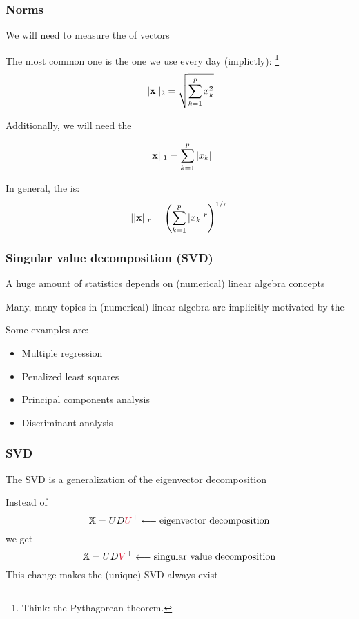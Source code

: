\documentclass{beamer}
\begin{document}
\begin{frame}
\frametitle{Norms}
We will need to measure the  of vectors

\vsp
The most common one is the one we use every day (implictly): \footnote{Think:
the Pythagorean theorem.}
\[
|| \mathbf{x} ||_2 = \sqrt{\sum_{k=1}^p x_k^2}
\]

\vsp
Additionally, we will need the 

\[
|| \mathbf{x} ||_1 = \sum_{k=1}^p |x_k|
\]

\vsp
In general, the  is:
\[
|| \mathbf{x} ||_r = \left(\sum_{k=1}^p |x_k|^r\right)^{1/r}
\]


\end{frame}



\begin{frame}
\frametitle{Singular value decomposition (SVD)}

A huge amount of statistics depends on (numerical) linear algebra concepts

\vsp
Many, many topics in (numerical) linear algebra are implicitly motivated by
the  

\vsp
Some examples are:

\begin{itemize}
\item Multiple regression
\item Penalized least squares
\item Principal components analysis
\item Discriminant analysis
\end{itemize}

\end{frame}


\begin{frame}
\frametitle{SVD}

The SVD is a generalization of the eigenvector decomposition

\vsp
Instead of
\[
\X = U D \alr{U}^{\top} \longleftarrow \textrm{eigenvector decomposition}
\]
we get
\[
\X = U D \alr{V}^{\top} \longleftarrow \textrm{singular value decomposition}
\]
This change makes the (unique) SVD always exist

\end{frame}
\end{document}

